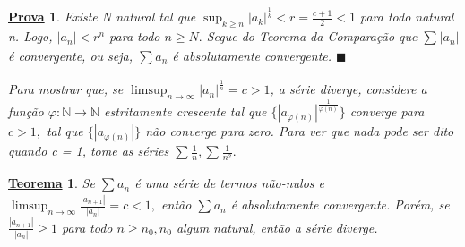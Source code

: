 \documentclass{article}
\newtheorem*{theorem*}{\underline{Teorema}}
\newtheorem*{proof*}{\underline{Prova}}
\renewcommand\qedsymbol{$\blacksquare$}
\begin{document}
\begin{proof*}
  Existe N natural tal que $\sup_{k\geq{n}}|a_{k}|^{\frac{1}{k}} < r = \frac{c+1}{2} < 1$ para todo natural n. Logo, $|a_{n}|<r^{n}$ para
todo $n\geq{N}.$ Segue do Teorema da Compara\c c\~ao que $\sum\limits_{}^{}|a_{n}|$ \'e convergente, ou seja, $\sum\limits_{}^{}a_{n}$ \'e absolutamente convergente. \qedsymbol
  
  Para mostrar que, se $\limsup_{n\to\infty}|a_{n}|^{\frac{1}{n}} = c > 1$, a s\'erie diverge, considere a fun\c c\~ao $\varphi:\mathbb{N}\rightarrow \mathbb{N}$
  estritamente crescente tal que $\{|a_{\varphi(n)}|^{\frac{1}{\varphi(n)}}\}$ converge para $c>1,$ tal que $\{|a_{\varphi(n)}|\}$
  n\~ao converge para zero. Para ver que nada pode ser dito quando c = 1, tome as s\'eries $\sum\limits_{}^{}\frac{1}{n}, \sum\limits_{}^{}\frac{1}{n^{2}}.$
\end{proof*}
\begin{theorem*}
  Se $\sum\limits_{}^{}a_{n}$ \'e uma s\'erie de termos n\~ao-nulos e $\limsup_{n\to\infty}\frac{|a_{n+1}|}{|a_{n}|} = c < 1,$ ent\~ao
 $\sum\limits_{}^{}a_{n}$ \'e absolutamente convergente. Por\'em, se $\frac{|a_{n+1}|}{|a_{n}|}\geq{1}$ para todo $n\geq{n_{0}}, n_{0}$ algum natural,
 ent\~ao a s\'erie diverge.
\end{theorem*}
\end{document}
